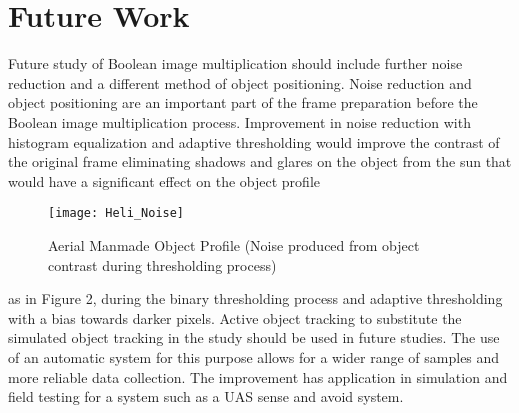 \section{Future Work}
\indent Future study of Boolean image multiplication should include further noise reduction and a different method of object positioning. Noise reduction and object positioning are an important part of the frame preparation before the Boolean image multiplication process.
\indent Improvement in noise reduction with histogram equalization and adaptive thresholding would improve the contrast of the original frame eliminating shadows and glares on the object from the sun that would have a significant effect on the object profile 

\begin{figure}[ht]
	\center 
	\texttt{[image: Heli\_Noise]}
	\caption[Noisy Aerial Manmade Object Profile]{Aerial Manmade Object Profile (Noise produced from object contrast during thresholding process)}
\end{figure}

as in Figure 2, during the binary thresholding process and adaptive thresholding with a bias towards darker pixels. 
Active object tracking to substitute the simulated object tracking in the study should be used in future studies. The use of an automatic system for this purpose allows for a wider range of samples and more reliable data collection. The improvement has application in simulation and field testing for a system such as a UAS sense and avoid system.



\newpage